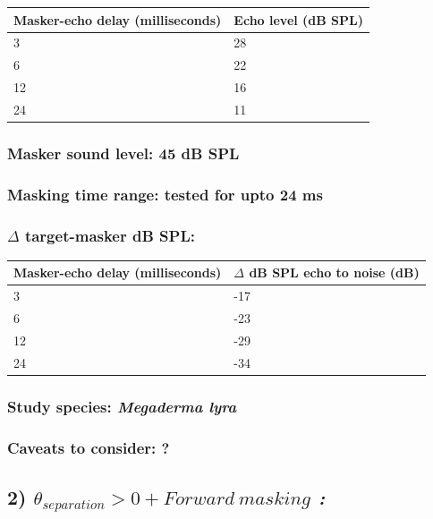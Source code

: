\documentclass[11pt]{article}
\begin{document}
\begin{longtable}[]{@{}ll@{}}
\toprule
Masker-echo delay (milliseconds) & Echo level (dB SPL)\tabularnewline
\midrule
\endhead
3 & 28\tabularnewline
6 & 22\tabularnewline
12 & 16\tabularnewline
24 & 11\tabularnewline
\bottomrule
\end{longtable}

\hypertarget{masker-sound-level-45-db-spl}{%
\subsubsection{Masker sound level: 45 dB
SPL}\label{masker-sound-level-45-db-spl}}

\hypertarget{masking-time-range-tested-for-upto-24-ms}{%
\subsubsection{Masking time range: tested for upto 24
ms}\label{masking-time-range-tested-for-upto-24-ms}}

\hypertarget{delta-target-masker-db-spl}{%
\subsubsection{\texorpdfstring{\(\Delta\) target-masker dB
SPL:}{\textbackslash{}Delta target-masker dB SPL:}}\label{delta-target-masker-db-spl}}

\begin{longtable}[]{@{}ll@{}}
\toprule
Masker-echo delay (milliseconds) & \(\Delta\) dB SPL echo to noise
(dB)\tabularnewline
\midrule
\endhead
3 & -17\tabularnewline
6 & -23\tabularnewline
12 & -29\tabularnewline
24 & -34\tabularnewline
\bottomrule
\end{longtable}

\hypertarget{study-species-megaderma-lyra}{%
\subsubsection{\texorpdfstring{Study species: \emph{Megaderma
lyra}}{Study species: Megaderma lyra}}\label{study-species-megaderma-lyra}}

\hypertarget{caveats-to-consider}{%
\subsubsection{Caveats to consider: ?}\label{caveats-to-consider}}

    

    \hypertarget{theta_separation0-forward-masking}{%
\subsection{\texorpdfstring{2)
\emph{\(\theta_{separation}>0 + Forward\ masking\) :
}}{2) \textbackslash{}theta\_\{separation\}\textgreater{}0 + Forward\textbackslash{} masking : }}\label{theta_separation0-forward-masking}}
\end{document}
